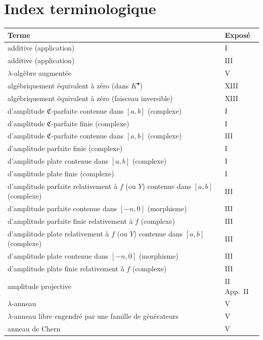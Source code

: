 \newpage
\section*{Index terminologique}

\begin{longtable}{p{8cm}l}
\toprule
\textbf{Terme} & \textbf{Expos\'e} \\
\midrule
\endhead

additive (application) & I \\
additive (application) & III \\
$\lambda$-alg\`ebre augment\'ee & V \\
alg\'ebriquement \'equivalent \`a z\'ero (dans $K^{\bullet}$) & XIII \\
alg\'ebriquement \'equivalent \`a z\'ero (faisceau inversible) & XIII \\
d'amplitude $\mathfrak{C}$-parfaite contenue dans $[a,b]$ (complexe) & I \\
d'amplitude $\mathfrak{C}$-parfaite finie (complexe) & I \\
d'amplitude $\mathfrak{C}$-parfaite contenue dans $[a,b]$ (complexe) & III \\
d'amplitude parfaite finie (complexe) & I \\
d'amplitude plate contenue dans $[a,b]$ (complexe) & I \\
d'amplitude plate finie (complexe) & I \\
d'amplitude parfaite relativement \`a $f$ (ou $Y$) contenue dans $[a,b]$ (complexe) & III \\
d'amplitude parfaite contenue dans $[-n,0]$ (morphisme) & III \\
d'amplitude parfaite finie relativement \`a $f$ (complexe) & III \\
d'amplitude plate relativement \`a $f$ (ou $Y$) contenue dans $[a,b]$ (complexe) & III \\
d'amplitude plate contenue dans $[-n,0]$ (morphisme) & III \\
d'amplitude plate finie relativement \`a $f$ (complexe) & III \\
amplitude projective & II App.\ II \\
$\lambda$-anneau & V \\
$\lambda$-anneau libre engendr\'e par une famille de g\'en\'erateurs & V \\
anneau de Chern & V \\

\end{longtable}
